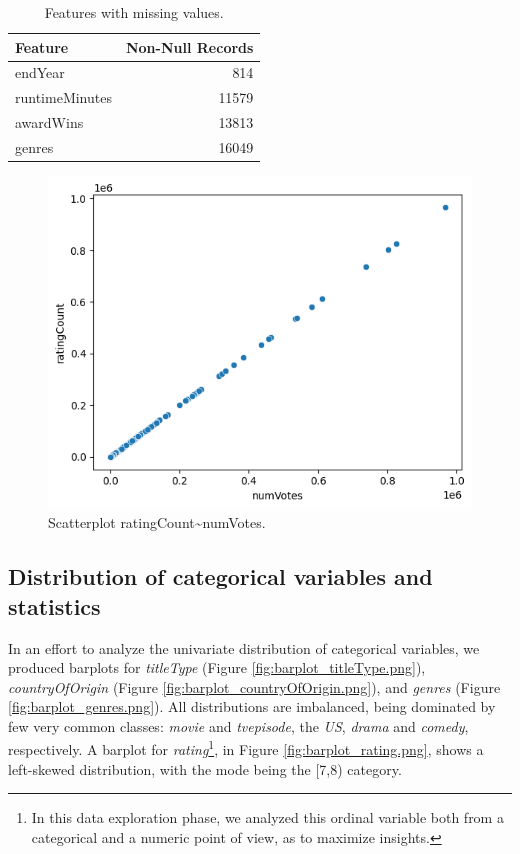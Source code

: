 \begin{table}[h]
    \centering
    \caption{Features with missing values.}
    \begin{tabular}{|l|r|}
        \hline
        \textbf{Feature} & \textbf{Non-Null Records} \\
        \hline
        endYear & 814 \\
        runtimeMinutes & 11579 \\
        awardWins & 13813 \\
        genres & 16049 \\
        \hline
    \end{tabular}
    \label{tab:feats_nan}
\end{table}

\begin{figure}
    \includegraphics[width=\columnwidth]{../../results/images/scatter_numVotes_ratingCount.png}
    \caption{Scatterplot ratingCount\textasciitilde numVotes.}
    \label{fig:scatterplot_numVotes_ratingCount}
\end{figure}

\subsection{Distribution of categorical variables and statistics}
In an effort to analyze the univariate distribution of categorical variables, we produced barplots for \textit{titleType} (Figure \ref{fig:barplot_titleType.png}), \textit{countryOfOrigin} (Figure \ref{fig:barplot_countryOfOrigin.png}), and \textit{genres} (Figure \ref{fig:barplot_genres.png}). All distributions are imbalanced, being dominated by few very common classes: \textit{movie} and \textit{tvepisode}, the \textit{US}, \textit{drama} and \textit{comedy}, respectively. A barplot for \textit{rating}\footnote{In this data exploration phase, we analyzed this ordinal variable both from a categorical and a numeric point of view, as to maximize insights.}, in Figure \ref{fig:barplot_rating.png}, shows a left-skewed distribution, with the mode being the [7,8) category.

